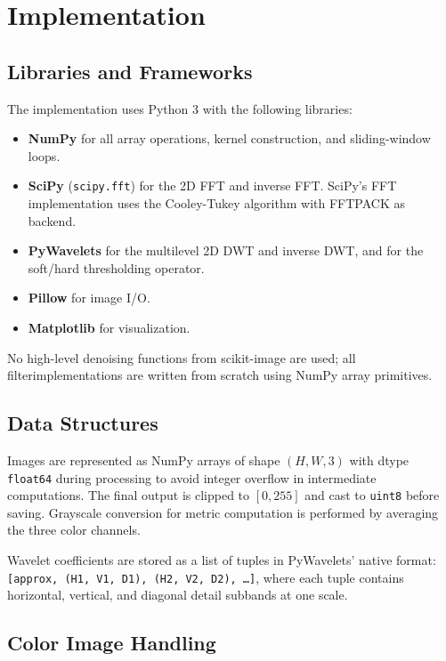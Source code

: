 \documentclass[conference]{IEEEtran}
\begin{document}
\section{Implementation}

\subsection{Libraries and Frameworks}

The implementation uses Python 3 with the following libraries:

\begin{itemize}
  \item \textbf{NumPy} for all array operations, kernel construction, and
    sliding-window loops.
  \item \textbf{SciPy} (\texttt{scipy.fft}) for the 2D FFT and inverse FFT.
    SciPy's FFT implementation uses the Cooley-Tukey algorithm with FFTPACK
    as backend.
  \item \textbf{PyWavelets} for the multilevel 2D DWT and inverse DWT, and for
    the soft/hard thresholding operator.
  \item \textbf{Pillow} for image I/O.
  \item \textbf{Matplotlib} for visualization.
\end{itemize}

No high-level denoising functions from scikit-image are used; all filterimplementations are written from scratch using NumPy array primitives.

\subsection{Data Structures}

Images are represented as NumPy arrays of shape $(H, W, 3)$ with dtype \texttt{float64} during processing to avoid integer overflow in intermediate computations. The final output is clipped to $[0, 255]$ and cast to \texttt{uint8} before saving. Grayscale conversion for metric computation is performed by averaging the three color channels.

Wavelet coefficients are stored as a list of tuples in PyWavelets' native format: \texttt{[approx, (H1, V1, D1), (H2, V2, D2), \ldots]}, where each tuple contains horizontal, vertical, and diagonal detail subbands at one scale.

\subsection{Color Image Handling}
\end{document}
